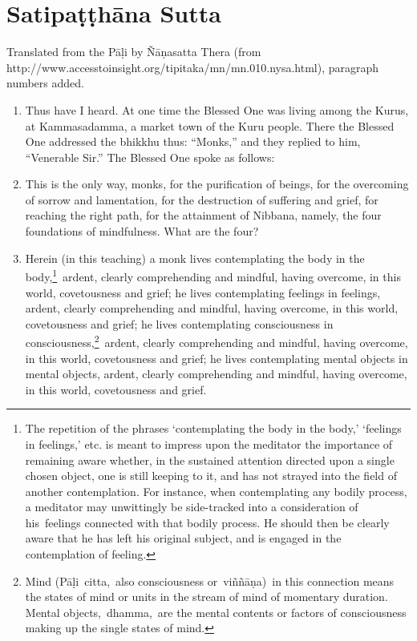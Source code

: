 \documentclass[a4 paper, 12pt]{article}
\begin{document}
\pagestyle{empty}

\section*{Satipaṭṭhāna Sutta}

Translated from the Pāḷi by Ñāṇasatta Thera (from http://www.accesstoinsight.org/tipitaka/mn/mn.010.nysa.html), paragraph numbers added.

\begin{multicols}{2}

\begin{enumerate}
\item Thus have I heard. At one time the Blessed One was living among the Kurus, at Kammasadamma, a market town of the Kuru people. There the Blessed One addressed the bhikkhu thus: ``Monks,'' and they replied to him, ``Venerable Sir.'' The Blessed One spoke as follows:
\item This is the only way, monks, for the purification of beings, for the overcoming of sorrow and lamentation, for the destruction of suffering and grief, for reaching the right path, for the attainment of Nibbana, namely, the four foundations of mindfulness. What are the four?
\item Herein (in this teaching) a monk lives contemplating the body in the body,\footnote{The repetition of the phrases ‘contemplating the body in the body,’ ‘feelings in feelings,’ etc. is meant to impress upon the meditator the importance of remaining aware whether, in the sustained attention directed upon a single chosen object, one is still keeping to it, and has not strayed into the field of another contemplation. For instance, when contemplating any bodily process, a meditator may unwittingly be side-tracked into a consideration of his feelings connected with that bodily process. He should then be clearly aware that he has left his original subject, and is engaged in the contemplation of feeling.} ardent, clearly comprehending and mindful, having overcome, in this world, covetousness and grief; he lives contemplating feelings in feelings, ardent, clearly comprehending and mindful, having overcome, in this world, covetousness and grief; he lives contemplating consciousness in consciousness,\footnote{Mind (Pāḷi citta, also consciousness or viññāṇa) in this connection means the states of mind or units in the stream of mind of momentary duration. Mental objects, dhamma, are the mental contents or factors of consciousness making up the single states of mind.} ardent, clearly comprehending and mindful, having overcome, in this world, covetousness and grief; he lives contemplating mental objects in mental objects, ardent, clearly comprehending and mindful, having overcome, in this world, covetousness and grief.
\end{enumerate}


\end{multicols}
\end{document}
